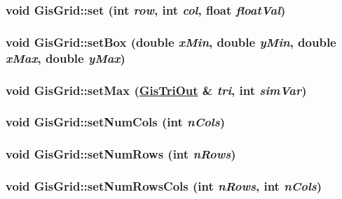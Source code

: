 \hypertarget{classGisGrid_a22}{
\subsubsection[set]{\setlength{\rightskip}{0pt plus 5cm}void Gis\-Grid::set (int {\em row}, int {\em col}, float {\em float\-Val})}}
\label{classGisGrid_a22}


\hypertarget{classGisGrid_a5}{
\subsubsection[setBox]{\setlength{\rightskip}{0pt plus 5cm}void Gis\-Grid::set\-Box (double {\em x\-Min}, double {\em y\-Min}, double {\em x\-Max}, double {\em y\-Max})}}
\label{classGisGrid_a5}


\hypertarget{classGisGrid_a16}{
\subsubsection[setMax]{\setlength{\rightskip}{0pt plus 5cm}void Gis\-Grid::set\-Max (\hyperlink{classGisTriOut}{Gis\-Tri\-Out} \& {\em tri}, int {\em sim\-Var})}}
\label{classGisGrid_a16}


\hypertarget{classGisGrid_a4}{
\subsubsection[setNumCols]{\setlength{\rightskip}{0pt plus 5cm}void Gis\-Grid::set\-Num\-Cols (int {\em n\-Cols})}}
\label{classGisGrid_a4}


\hypertarget{classGisGrid_a3}{
\subsubsection[setNumRows]{\setlength{\rightskip}{0pt plus 5cm}void Gis\-Grid::set\-Num\-Rows (int {\em n\-Rows})}}
\label{classGisGrid_a3}


\hypertarget{classGisGrid_a2}{
\subsubsection[setNumRowsCols]{\setlength{\rightskip}{0pt plus 5cm}void Gis\-Grid::set\-Num\-Rows\-Cols (int {\em n\-Rows}, int {\em n\-Cols})}}
\label{classGisGrid_a2}


